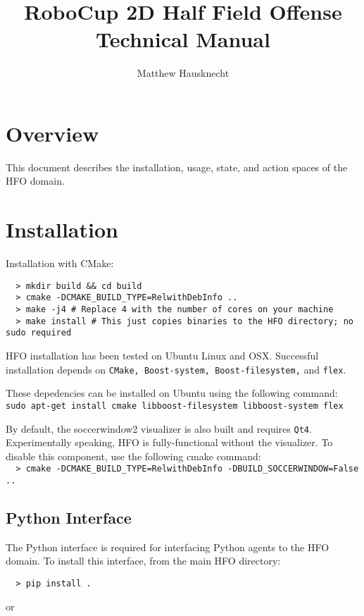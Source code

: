 \documentclass[12pt]{article}
\title{RoboCup 2D Half Field Offense \\ Technical Manual}
\author{Matthew Hausknecht}
\begin{document}
\maketitle
\tableofcontents

\section{Overview}

This document describes the installation, usage, state, and action spaces of the HFO domain.

\section{Installation}

Installation with CMake:

\begin{verbatim}
  > mkdir build && cd build
  > cmake -DCMAKE_BUILD_TYPE=RelwithDebInfo ..
  > make -j4 # Replace 4 with the number of cores on your machine
  > make install # This just copies binaries to the HFO directory; no sudo required
\end{verbatim}

HFO installation has been tested on Ubuntu Linux and OSX. Successful
installation depends on
\verb+CMake, Boost-system, Boost-filesystem,+ and \verb+flex+.

These depedencies can be installed on Ubuntu using the following
command:\\
\verb+sudo apt-get install cmake libboost-filesystem libboost-system flex+

By default, the soccerwindow2 visualizer is also built and requires
\verb+Qt4+. Experimentally speaking, HFO is fully-functional without
the visualizer. To disable this component, use the following cmake
command:\\

\noindent \verb+  > cmake -DCMAKE_BUILD_TYPE=RelwithDebInfo -DBUILD_SOCCERWINDOW=False ..+

\subsection{Python Interface}

The Python interface is required for interfacing Python agents to the
HFO domain. To install this interface, from the main HFO directory:

\noindent \verb+  > pip install .+

or
\end{document}

